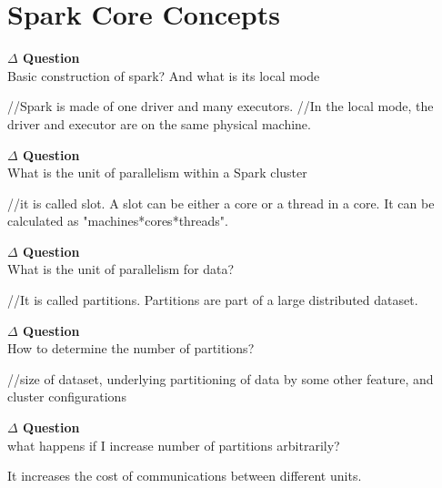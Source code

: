 \documentclass[12pt]{article}
\newenvironment{que}
    { \begin{mdframed}[backgroundcolor=green!20] \textbf{$\Delta$ Question} \\}
    {  \end{mdframed}}
\begin{document}
\section{Spark Core Concepts}
\begin{que}
Basic construction of spark? And what is its local mode
\end{que}
\begin{code}
//Spark is made of one driver and many executors.
//In the local mode, the driver and executor are on the same physical machine.
\end{code}
\begin{que}
What is the unit of parallelism within a Spark cluster
\end{que}
\begin{code}
//it is called slot. A slot can be either a core or a thread in a core. It can be calculated as "machines*cores*threads".
\end{code}
\begin{que}
What is the unit of parallelism for data?
\end{que}
\begin{code}
//It is called partitions. Partitions are part of a large distributed dataset.
\end{code}
\begin{que}
How to determine the number of partitions?
\end{que}
\begin{code}
//size of dataset, underlying partitioning of data by some other feature, and cluster configurations 
\end{code}
\begin{que}
what happens if I increase number of partitions arbitrarily?
\end{que}
\begin{code}
It increases the cost of communications between different units.
\end{code}
\end{document}
